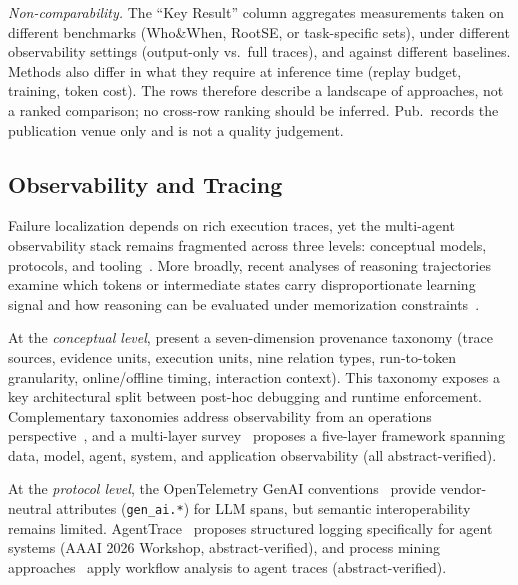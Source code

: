 \vspace{-2pt}
{\footnotesize \emph{Non-comparability.} The ``Key Result'' column aggregates measurements taken on different benchmarks (Who\&When, RootSE, or task-specific sets), under different observability settings (output-only vs.\ full traces), and against different baselines. Methods also differ in what they require at inference time (replay budget, training, token cost). The rows therefore describe a landscape of approaches, not a ranked comparison; no cross-row ranking should be inferred. Pub.\ records the publication venue only and is not a quality judgement.}

\subsection{Observability and Tracing}\label{sec:diag_obs}

Failure localization depends on rich execution traces, yet the multi-agent observability stack remains fragmented across three levels: conceptual models, protocols, and tooling~\cite{aiobsmultilayer2026}. More broadly, recent analyses of reasoning trajectories examine which tokens or intermediate states carry disproportionate learning signal and how reasoning can be evaluated under memorization constraints~\cite{jiang2026rocktokens,jiang-ferraro-2026-beyond}.

At the \emph{conceptual level}, \cite{agenttraces2026} present a seven-dimension provenance taxonomy (trace sources, evidence units, execution units, nine relation types, run-to-token granularity, online/offline timing, interaction context). This taxonomy exposes a key architectural split between post-hoc debugging and runtime enforcement. Complementary taxonomies address observability from an operations perspective~\cite{agentopscsiro2024, architectingops2026, agentsysops2026}, and a multi-layer survey~\cite{aiobsmultilayer2026} proposes a five-layer framework spanning data, model, agent, system, and application observability (all abstract-verified).

At the \emph{protocol level}, the OpenTelemetry GenAI conventions~\cite{opentelemetry2026} provide vendor-neutral attributes (\texttt{gen\_ai.*}) for LLM spans, but semantic interoperability remains limited. AgentTrace~\cite{agenttrace2026} proposes structured logging specifically for agent systems (AAAI 2026 Workshop, abstract-verified), and process mining approaches~\cite{processobserv2025} apply workflow analysis to agent traces (abstract-verified).

